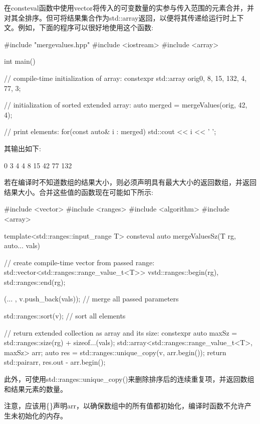 在consteval函数中使用vector将传入的可变数量的实参与传入范围的元素合并，并对其全排序。但可将结果集合作为std::array返回，以便将其传递给运行时上下文。例如，下面的程序可以很好地使用这个函数:


\begin{cpp}
#include "mergevalues.hpp"
#include <iostream>
#include <array>

int main()
{
	// compile-time initialization of array:
	constexpr std::array orig{0, 8, 15, 132, 4, 77, 3};

	// initialization of sorted extended array:
	auto merged = mergeValues(orig, 42, 4);

	// print elements:
	for(const auto& i : merged) {
		std::cout << i << ' ';
	}
}
\end{cpp}

其输出如下:

\begin{shell}
0 3 4 4 8 15 42 77 132
\end{shell}

若在编译时不知道数组的结果大小，则必须声明具有最大大小的返回数组，并返回结果大小。合并这些值的函数现在可能如下所示:


\begin{cpp}
#include <vector>
#include <ranges>
#include <algorithm>
#include <array>

template<std::ranges::input_range T>
consteval auto mergeValuesSz(T rg, auto... vals)
{
	// create compile-time vector from passed range:
	std::vector<std::ranges::range_value_t<T>> v{std::ranges::begin(rg),
												 std::ranges::end(rg)};

	(... , v.push_back(vals)); // merge all passed parameters

	std::ranges::sort(v); // sort all elements

	// return extended collection as array and its size:
	constexpr auto maxSz = std::ranges::size(rg) + sizeof...(vals);
	std::array<std::ranges::range_value_t<T>, maxSz> arr{};
	auto res = std::ranges::unique_copy(v, arr.begin());
	return std::pair{arr, res.out - arr.begin()};
}
\end{cpp}

此外，可使用std::ranges::unique\_copy()来删除排序后的连续重复项，并返回数组和结果元素的数量。

注意，应该用\{\}声明arr，以确保数组中的所有值都初始化，编译时函数不允许产生未初始化的内存。

